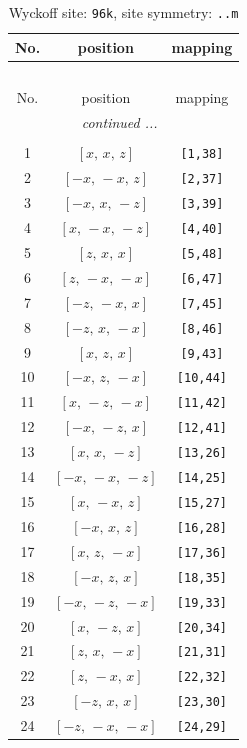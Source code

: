\documentclass[fleqn,8pt]{jsarticle}
\begin{document}
\renewcommand{\arraystretch}{1.2}
\begin{longtable}{ccc}
\caption{Wyckoff site: {\tt 96k}, site symmetry: {\tt ..m}}
 \\
 \hline \hline
No. & position & mapping \\ \hline \endfirsthead

\multicolumn{2}{l}{\tablename\ \thetable{}} \\
 \hline \hline
No. & position & mapping \\ \hline \endhead

 \hline \hline
\multicolumn{2}{r}{\footnotesize\it continued ...} \\ \endfoot

 \hline \hline
\multicolumn{2}{r}{} \\ \endlastfoot

1 & $\left[ x,\, x,\, z \right]$ & {\tt [1,38]} \\ \hline
2 & $\left[ - x,\, - x,\, z \right]$ & {\tt [2,37]} \\ \hline
3 & $\left[ - x,\, x,\, - z \right]$ & {\tt [3,39]} \\ \hline
4 & $\left[ x,\, - x,\, - z \right]$ & {\tt [4,40]} \\ \hline
5 & $\left[ z,\, x,\, x \right]$ & {\tt [5,48]} \\ \hline
6 & $\left[ z,\, - x,\, - x \right]$ & {\tt [6,47]} \\ \hline
7 & $\left[ - z,\, - x,\, x \right]$ & {\tt [7,45]} \\ \hline
8 & $\left[ - z,\, x,\, - x \right]$ & {\tt [8,46]} \\ \hline
9 & $\left[ x,\, z,\, x \right]$ & {\tt [9,43]} \\ \hline
10 & $\left[ - x,\, z,\, - x \right]$ & {\tt [10,44]} \\ \hline
11 & $\left[ x,\, - z,\, - x \right]$ & {\tt [11,42]} \\ \hline
12 & $\left[ - x,\, - z,\, x \right]$ & {\tt [12,41]} \\ \hline
13 & $\left[ x,\, x,\, - z \right]$ & {\tt [13,26]} \\ \hline
14 & $\left[ - x,\, - x,\, - z \right]$ & {\tt [14,25]} \\ \hline
15 & $\left[ x,\, - x,\, z \right]$ & {\tt [15,27]} \\ \hline
16 & $\left[ - x,\, x,\, z \right]$ & {\tt [16,28]} \\ \hline
17 & $\left[ x,\, z,\, - x \right]$ & {\tt [17,36]} \\ \hline
18 & $\left[ - x,\, z,\, x \right]$ & {\tt [18,35]} \\ \hline
19 & $\left[ - x,\, - z,\, - x \right]$ & {\tt [19,33]} \\ \hline
20 & $\left[ x,\, - z,\, x \right]$ & {\tt [20,34]} \\ \hline
21 & $\left[ z,\, x,\, - x \right]$ & {\tt [21,31]} \\ \hline
22 & $\left[ z,\, - x,\, x \right]$ & {\tt [22,32]} \\ \hline
23 & $\left[ - z,\, x,\, x \right]$ & {\tt [23,30]} \\ \hline
24 & $\left[ - z,\, - x,\, - x \right]$ & {\tt [24,29]} \\
\end{longtable}
\end{document}
